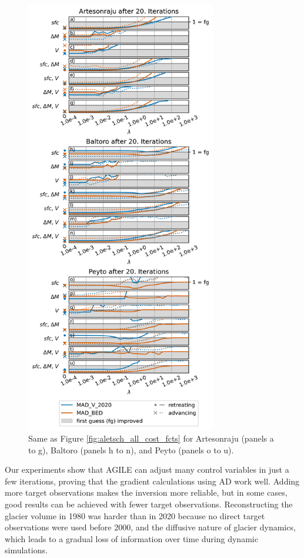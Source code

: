 \documentclass[journal abbreviation, manuscript]{copernicus}
\begin{document}
\begin{figure}
    \centering
    \includegraphics[width=8.3cm]{fig09.png}
    \caption{Same as Figure \ref{fig:aletsch_all_cost_fcts} for Artesonraju (panels a to g), Baltoro (panels h to n), and Peyto (panels o to u).}
    \label{fig:artensonraju_baltoro_peyto_all_cost_fcts}
\end{figure}


\label{sec:conclusion}

Our experiments show that AGILE can adjust many control variables in just a few iterations, proving that the gradient calculations using AD work well. Adding more target observations makes the inversion more reliable, but in some cases, good results can be achieved with fewer target observations. Reconstructing the glacier volume in 1980 was harder than in 2020 because no direct target observations were used before 2000, and the diffusive nature of glacier dynamics, which leads to a gradual loss of information over time during dynamic simulations.
\end{document}
